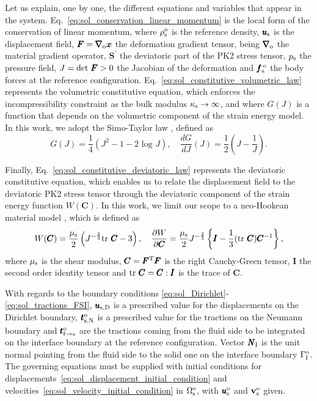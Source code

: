\documentclass[11pt,english]{article}
\def\usolid{\pmb{u}_{\rm{s}}}                   %
\def\psolid{p_{\rm{s}}}                         %
\def\devPK{\pmb{S}^\prime}                      %
\def\x{\pmb{x}}                             %
\def\F{\pmb{F}}                             %
\def\C{\pmb{C}}                             %
\def\invC{\pmb{C}^{-1}}                     %
\def\Ftrans{\pmb{F}^{\rm{T}}}               %
\def\dGdJ{\frac{dG}{dJ}}                    %
\def\dWdC{\frac{\partial W}{\partial \C}}   %
\def\vsolid{\vb{v}_{\rm{s}}}               %
\def\domainsolidreference{\Omega_{\rm{s}}^{\rm{o}}}  %
\def\usolidDir{\pmb{u}_{\rm{s},\rm{D}}}                    %
\def\reftract{\pmb{t}_{\rm{s},\rm{N}}^{\rm{o}}}            %
\def\bodyfsolid{\pmb{f}_{\rm{s}}^{\,\rm{o}}}        %
\def\grad{\pmb{\nabla}_{\rm{o}}}        %
\def\denssolid{\rho_{\rm{s}}^{\rm{o}}}  %
\def\musolid{\mu_{\rm{s}}}              %
\def\kappasolid{\kappa_{\rm{s}}}        %
\def\x{\boldsymbol{x}}
\def\boundaryFSIreference{\Gamma_{\rm{I}}^{\rm{o}}}
\def\FSItract{\pmb{t}_{\rm{f}\to{\rm{s}}}}
\def\FSItractref{\FSItract^{\rm{o}}}
\def\NormalFSI{\pmb{N}_{\rm{I}}}
\begin{document}
Let us explain, one by one, the different equations and variables that appear in the system. Eq.~\eqref{eq:sol_conservation_linear_momentum} is the local form of the conservation of linear momentum, where $\denssolid$ is the reference density, $\usolid$ is the displacement field, $\F = \grad \x $ the deformation gradient tensor, being $\grad$ the material gradient operator, $\devPK$ the deviatoric part of the PK2 stress tensor, $\psolid$ the pressure field, $J=\rm{det}~\F > 0$ the Jacobian of the deformation and $\bodyfsolid$ the body forces at the reference configuration. Eq.~\eqref{eq:sol_constitutive_volumetric_law} represents the volumetric constitutive equation, which enforces the incompressibility constraint as the bulk modulus $\kappasolid \to \infty$, and where $G(J)$ is a function that depends on the volumetric component of the strain energy model. In this work, we adopt the Simo-Taylor law \cite{Simo}, defined as
\begin{equation*}
    G(J) = \frac{1}{4} \left (  J^2 - 1 -2 \text{ log }J \right ), \quad \dGdJ(J) = \frac{1}{2} \left( J - \frac{1}{J} \right).
\end{equation*}

Finally, Eq.~\eqref{eq:sol_constitutive_deviatoric_law} represents the deviatoric constitutive equation, which enables us to relate the displacement field to the deviatoric PK2 stress tensor through the deviatoric component of the strain energy function $W(\C)$. In this work, we limit our scope to a neo-Hookean material model \cite{Scovazzi2016}, which is defined as
\begin{equation*}
    W ( \C) = \frac{\musolid}{2} \left ( J^{-\frac{2}{3}}\hbox{tr }\C - 3 \right ), \quad \dWdC=\frac{\musolid}{2}J^{-\frac{2}{3}}\left \lbrace \pmb{I}-\frac{1}{3} (\hbox{tr }\C) \invC \right \rbrace,
\end{equation*}
where $\musolid$ is the shear modulus, $\C=\Ftrans \F$ is the right Cauchy-Green tensor, $\pmb{I}$ the second order identity tensor and $\hbox{tr }\C=\C:\pmb{I}$ is the trace of $\C$.

With regards to the boundary conditions \eqref{eq:sol_Dirichlet}-\eqref{eq:sol_tractions_FSI}, $\usolidDir$ is a prescribed value for the displacements on the Dirichlet boundary, $\reftract$ is a prescribed value for the tractions on the Neumann boundary and $\FSItractref$ are the tractions coming from the fluid side to be integrated on the interface boundary at the reference configuration. Vector $\NormalFSI$ is the unit normal pointing from the fluid side to the solid one on the interface boundary $\boundaryFSIreference$. The governing equations must be supplied with initial conditions for displacements~\eqref{eq:sol_displacement_initial_condition} and velocities~\eqref{eq:sol_velocity_initial_condition} in $\domainsolidreference$, with $\usolid^{\rm{o}}$ and $\vsolid^{\rm{o}}$ given.
\end{document}

